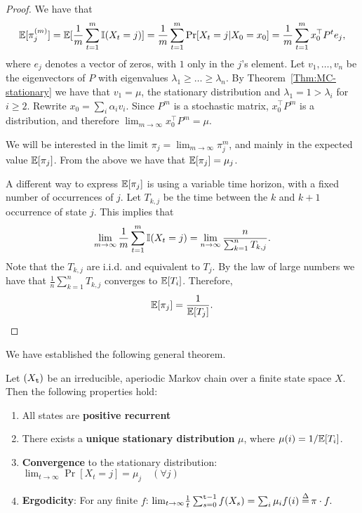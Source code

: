 \begin{proof}
We have that
\[
\mathbb{E}[\pi^{(m)}_j]=\mathbb{E}[\frac{1}{m}\sum_{t=1}^m \mathbb{I}
(X_t=j)]=\frac{1}{m}\sum_{t=1}^m \Pr
[X_t=j|X_0=x_0]=\frac{1}{m}\sum_{t=1}^m x_0^\top P^t e_j,
\]
where $e_j$ denotes a vector of zeros, with $1$ only in the $j$'s element. Let $v_1, \ldots , v_n$ be the eigenvectors of $P$ with eigenvalues
$\lambda_1 \geq  \ldots \geq  \lambda_n$. By
Theorem~\ref{Thm:MC-stationary} we have that $v_1=\mu$, the stationary
distribution and $\lambda_1=1>\lambda_i$ for $i\geq 2$. Rewrite
$x_0=\sum_i \alpha_i v_i$. Since $P^m$ is a stochastic matrix,
$x_0^\top P^m$ is a distribution, and therefore $\lim_{m\rightarrow
\infty} x_0^\top P^m=\mu$.

We will be interested in the limit $\pi_j=\lim_{m\rightarrow \infty}
\pi^{m}_j $, and mainly in the expected value $\mathbb{E}[\pi_j]$. From the
above we have that $\mathbb{E}[\pi_j]=\mu_j$.

A different way to express $\mathbb{E}[\pi_j]$ is using a variable time
horizon, with a fixed number of occurrences of $j$. Let $T_{k,j}$ be
the time between the $k$ and $k+1$ occurrence of state $j$. This
implies that
\[
\lim_{m\rightarrow\infty}\frac{1}{m}\sum_{t=1}^m \mathbb{I} (X_t=j) =
\lim_{n\rightarrow\infty} \frac{n}{\sum_{k=1}^n T_{k,j}}.
\]
Note that the $T_{k,j}$ are i.i.d. and equivalent to $T_j$. By the
law of large numbers we have that $\frac{1}{n}\sum_{k=1}^n T_{k,j}$
converges to $\mathbb{E}[T_i]$. Therefore,
\[
\mathbb{E}[\pi_j]=\frac{1}{\mathbb{E}[T_j]}.
\]
\end{proof}

We have established the following general theorem.

\begin{theorem}\label{thm:finite_Markov_chains}
Let $({X_{\tt t}})$ be an irreducible,  aperiodic Markov chain over
a finite state space $X$.  Then the following properties hold:
\begin{enumerate}
\item All states are \textbf{positive recurrent}
\item There exists a \textbf{unique stationary distribution}
${\mu}$, where $\mu(i)=1/\mathbb{E}[T_i]$.
\item \textbf{Convergence} to the stationary distribution: 
${\lim _{t \to \infty }}\Pr
[X_t=j] = {\mu_j}\quad (\forall j)$
\item \textbf{Ergodicity}: For any finite $f$: ${\lim _{t \to \infty }}\frac{1}{t}\sum\nolimits_{s = 0}^{\ttime - 1} {f({X_s}) = \sum\nolimits_i {\mu_i f(i) \buildrel \Delta \over = } } \,\pi  \cdot f.$
\end{enumerate}
\end{theorem}

